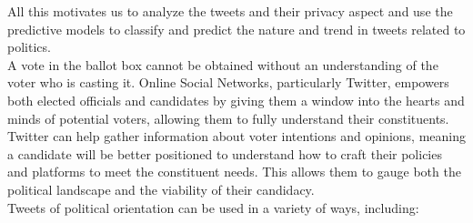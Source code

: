 \documentclass[a4paper,11pt]{article}
\begin{document}
All this motivates us to analyze the tweets and their privacy aspect and use the predictive models to classify and predict the nature and trend in tweets related to politics.\medskip\\
A vote in the ballot box cannot be obtained without an understanding of the voter who is casting it. Online Social Networks, particularly Twitter, empowers both elected officials and candidates by giving them a window into the hearts and minds of potential voters, allowing them to fully understand their constituents. Twitter can help gather information about voter intentions and opinions, meaning a candidate will be better positioned to understand how to craft their policies and platforms to meet the constituent needs.  This allows them to gauge both the political landscape and the viability of their candidacy.\medskip\\
Tweets of political orientation can be used in a variety of ways, including:
\end{document}
